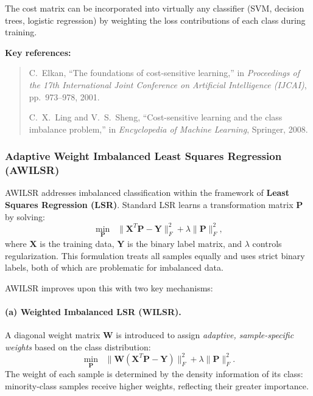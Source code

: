 \documentclass[11pt,a4paper]{article}
\begin{document}
The cost matrix can be incorporated into virtually any classifier (SVM, decision trees, logistic regression) by weighting the loss contributions of each class during training.
 
\medskip
\noindent\textbf{Key references:}
\begin{quote}
C.\ Elkan, ``The foundations of cost-sensitive learning,'' in \textit{Proceedings of the 17th International Joint Conference on Artificial Intelligence (IJCAI)}, pp.~973--978, 2001.
 
\medskip
C.\ X.\ Ling and V.\ S.\ Sheng, ``Cost-sensitive learning and the class imbalance problem,'' in \textit{Encyclopedia of Machine Learning}, Springer, 2008.
\end{quote}
 

\subsubsection{Adaptive Weight Imbalanced Least Squares Regression (AWILSR)}
 
AWILSR addresses imbalanced classification within the framework of \textbf{Least Squares Regression (LSR)}. Standard LSR learns a transformation matrix $\mathbf{P}$ by solving:
\[
\min_{\mathbf{P}} \;\; \|\mathbf{X}^T \mathbf{P} - \mathbf{Y}\|_F^2 + \lambda\|\mathbf{P}\|_F^2,
\]
where $\mathbf{X}$ is the training data, $\mathbf{Y}$ is the binary label matrix, and $\lambda$ controls regularization. This formulation treats all samples equally and uses strict binary labels, both of which are problematic for imbalanced data.
 
AWILSR improves upon this with two key mechanisms:
 
\paragraph{(a) Weighted Imbalanced LSR (WILSR).}
A diagonal weight matrix $\mathbf{W}$ is introduced to assign \emph{adaptive, sample-specific weights} based on the class distribution:
\[
\min_{\mathbf{P}} \;\; \|\mathbf{W}(\mathbf{X}^T \mathbf{P} - \mathbf{Y})\|_F^2 + \lambda\|\mathbf{P}\|_F^2.
\]
The weight of each sample is determined by the density information of its class: minority-class samples receive higher weights, reflecting their greater importance.
 
\end{document}

